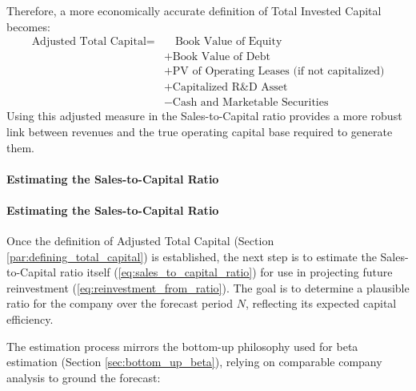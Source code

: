 Therefore, a more economically accurate definition of Total Invested Capital becomes:
\begin{align*} \label{eq:adjusted_total_capital}
    \text{Adjusted Total Capital} = & \quad \text{Book Value of Equity}                               \\
                                    & + \text{Book Value of Debt}                                     \\
                                    & + \text{PV of Operating Leases (if not capitalized)} \\
                                    & + \text{Capitalized R\&D Asset}                                 \\
                                    & - \text{Cash and Marketable Securities}
\end{align*}
Using this adjusted measure in the Sales-to-Capital ratio provides a more robust link between revenues and the true operating capital base required to generate them.

\paragraph{Estimating the Sales-to-Capital Ratio}
\paragraph{Estimating the Sales-to-Capital Ratio} \label{par:estimating_sales_to_capital}
Once the definition of Adjusted Total Capital (Section \ref{par:defining_total_capital}) is established, the next step is to estimate the Sales-to-Capital ratio itself (\ref{eq:sales_to_capital_ratio}) for use in projecting future reinvestment (\ref{eq:reinvestment_from_ratio}). The goal is to determine a plausible ratio for the company over the forecast period \(N\), reflecting its expected capital efficiency.

The estimation process mirrors the bottom-up philosophy used for beta estimation (Section \ref{sec:bottom_up_beta}), relying on comparable company analysis to ground the forecast:

